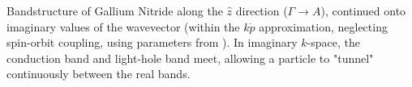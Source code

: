 Bandstructure of Gallium Nitride along the $\hat{z}$ direction ($\Gamma\rightarrow A$), continued onto imaginary values of the wavevector (within the $k\dot p$ approximation, neglecting spin-orbit coupling, using parameters from \cite{Rinke_2008}).  In imaginary $k$-space, the conduction band and light-hole band meet, allowing a particle to "tunnel" continuously between the real bands.